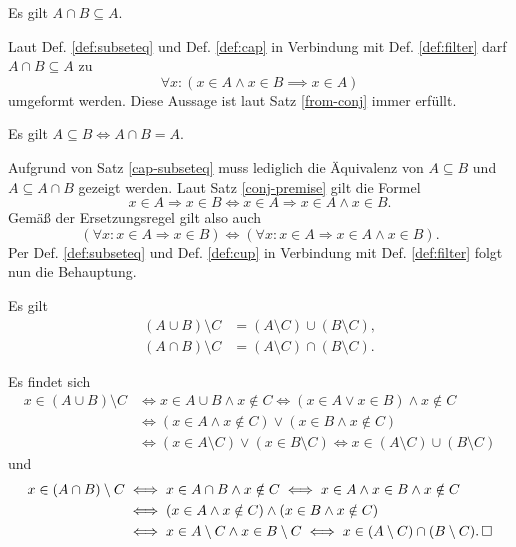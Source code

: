 \begin{Satz}\label{cap-subseteq}
Es gilt $A\cap B\subseteq A$.
\end{Satz}
\begin{Beweis}
Laut Def. \ref{def:subseteq} und Def. \ref{def:cap} in Verbindung
mit Def. \ref{def:filter} darf $A\cap B\subseteq A$ zu
\[\forall x\colon (x\in A\land x\in B\implies x\in A)\]
umgeformt werden. Diese Aussage ist laut Satz \ref{from-conj}
immer erfüllt.
\end{Beweis}

\begin{Satz}\label{subseteq-char}
Es gilt $A\subseteq B\iff A\cap B=A$.
\end{Satz}
\begin{Beweis}
Aufgrund von Satz \ref{cap-subseteq} muss lediglich die Äquivalenz
von $A\subseteq B$ und $A\subseteq A\cap B$ gezeigt werden.
Laut Satz \ref{conj-premise} gilt die Formel
\[x\in A\Rightarrow x\in B\iff x\in A\Rightarrow x\in A\land x\in B.\]
Gemäß der Ersetzungsregel gilt also auch
\[(\forall x\colon x\in A\Rightarrow x\in B)
\iff (\forall x\colon x\in A\Rightarrow x\in A\land x\in B).\]
Per Def. \ref{def:subseteq} und Def. \ref{def:cup} in Verbindung
mit Def. \ref{def:filter} folgt nun die Behauptung.\,\qedsymbol
\end{Beweis}

\begin{Satz}\label{setdiff-dist}
Es gilt
\begin{align*}
(A\cup B)\setminus C &= (A\setminus C)\cup (B\setminus C),\\
(A\cap B)\setminus C &= (A\setminus C)\cap (B\setminus C).
\end{align*}
\end{Satz}
\begin{Beweis}
Es findet sich
\begin{align*}
x\in (A\cup B)\setminus C &\iff x\in A\cup B\land x\notin C
\iff (x\in A\lor x\in B)\land x\notin C\\
&\iff (x\in A\land x\notin C)\lor (x\in B\land x\notin C)\\
&\iff (x\in A\setminus C)\lor (x\in B\setminus C)
\iff x\in (A\setminus C)\cup (B\setminus C)
\end{align*}
und
\begin{align*}
x\in (A\cap B)\setminus C&\iff x\in A\cap B\land x\notin C
\iff x\in A\land x\in B\land x\notin C\\
&\iff (x\in A\land x\notin C)\land (x\in B\land x\notin C)\\
& \iff x\in A\setminus C\land x\in B\setminus C
\iff x\in (A\setminus C)\cap (B\setminus C).\,\square
\end{align*}
\end{Beweis}

